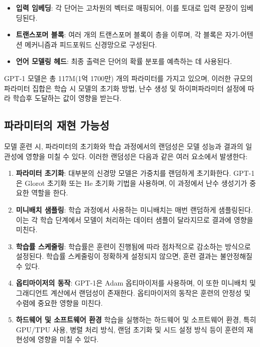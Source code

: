 \documentclass[conference]{IEEEtran}
\begin{document}
\begin{itemize}
\item \textbf{입력 임베딩}: 각 단어는 고차원의 벡터로 매핑되어, 이를 토대로 입력 문장이 임베딩된다.\\
\item \textbf{트랜스포머 블록}: 여러 개의 트랜스포머 블록이 층을 이루며, 각 블록은 자기-어텐션 메커니즘과 피드포워드 신경망으로 구성된다.\\
\item \textbf{언어 모델링 헤드}: 최종 출력은 단어의 확률 분포를 예측하는 데 사용된다.\\
\end{itemize}

GPT-1 모델은 총 117M(1억 1700만) 개의 파라미터를 가지고 있으며, 이러한 규모의 파라미터 집합은 학습 시 모델의 초기화 방법, 난수 생성 및 하이퍼파라미터 설정에 따라 학습후 도달하는 값이 영향을 받는다.

\subsection{파라미터의 재현 가능성}
모델 훈련 시, 파라미터의 초기화와 학습 과정에서의 랜덤성은 모델 성능과 결과의 일관성에 영향을 미칠 수 있다. 이러한 랜덤성은 다음과 같은 여러 요소에서 발생한다:

\begin{enumerate}
\item \textbf{파라미터 초기화}: 대부분의 신경망 모델은 가중치를 랜덤하게 초기화한다. GPT-1은 Glorot 초기화 또는 He 초기화 기법을 사용하며, 이 과정에서 난수 생성기가 중요한 역할을 한다.\\
\item \textbf{미니배치 샘플링}: 학습 과정에서 사용하는 미니배치는 매번 랜덤하게 샘플링된다. 이는 각 학습 단계에서 모델이 처리하는 데이터 샘플이 달라지므로 결과에 영향을 미친다.\\
\item \textbf{학습률 스케줄링}: 학습률은 훈련이 진행됨에 따라 점차적으로 감소하는 방식으로 설정된다. 학습률 스케줄링이 정확하게 설정되지 않으면, 훈련 결과는 불안정해질 수 있다.\\
\item \textbf{옵티마이저의 동작}: GPT-1은 Adam 옵티마이저를 사용하며, 이 또한 미니배치 및 그래디언트 계산에서 랜덤성이 존재한다. 옵티마이저의 동작은 훈련의 안정성 및 수렴에 중요한 영향을 미친다.\\
\item \textbf{하드웨어 및 소프트웨어 환경} 학습을 실행하는 하드웨어 및 소프트웨어 환경, 특히 GPU/TPU 사용, 병렬 처리 방식, 랜덤 초기화 및 시드 설정 방식 등이 훈련의 재현성에 영향을 미칠 수 있다.\\
\end{enumerate}
\end{document}
